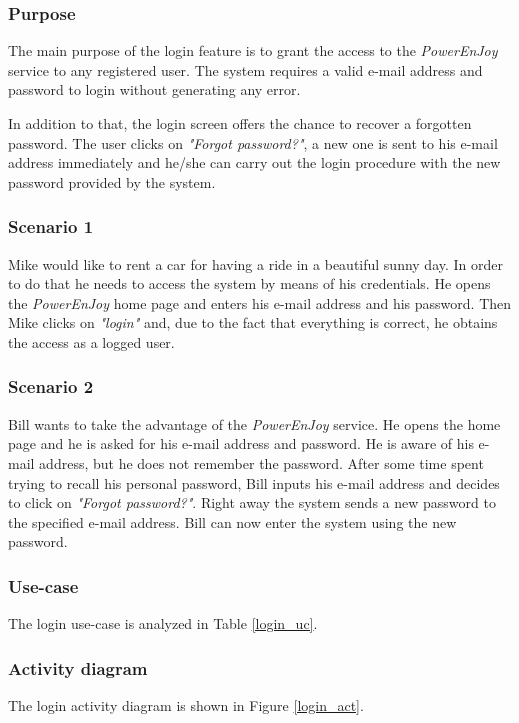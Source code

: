 \subsubsection{Purpose}
The main purpose of the login feature is to grant the access to the \emph{PowerEnJoy} service to any registered user. The system requires a valid e-mail address and password to login without generating any error.

In addition to that, the login screen offers the chance to recover a forgotten password. The user clicks on \emph{"Forgot password?"}, a new one is sent to his e-mail address immediately and he/she can carry out the login procedure with the new password provided by the system.

\subsubsection{Scenario 1}
Mike would like to rent a car for having a ride in a beautiful sunny day. In order to do that he needs to access the system by means of his credentials. He opens the \emph{PowerEnJoy} home page and enters his e-mail address and his password. Then Mike clicks on \emph{"login"} and, due to the fact that everything is correct, he obtains the access as a logged user.

\subsubsection{Scenario 2}
Bill wants to take the advantage of the \emph{PowerEnJoy} service. He opens the home page and he is asked for his e-mail address and password. He is aware of his e-mail address, but he does not remember the password. After some time spent trying to recall his personal password, Bill inputs his e-mail address and decides to click on \emph{"Forgot password?"}. Right away the system sends a new password to the specified e-mail address. Bill can now enter the system using the new password.

\subsubsection{Use-case}
The login use-case is analyzed in Table \ref{login_uc}.

\subsubsection{Activity diagram}
The login activity diagram is shown in Figure \ref{login_act}.

